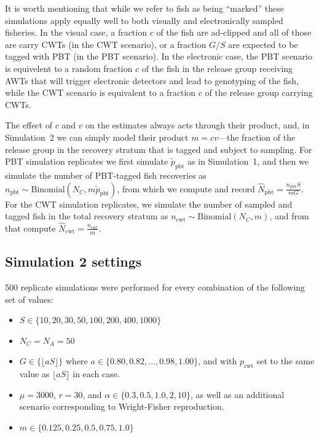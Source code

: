 \documentclass[11pt]{article}
\begin{document}
It is worth mentioning that while we refer to fish as being ``marked'' these simulations apply equally well to both visually
and electronically sampled fisheries.  In the visual case, a fraction $c$ of the fish are ad-clipped and all of those are
carry CWTs (in the CWT scenario), or a fraction $G/S$ are expected to be tagged with PBT (in the PBT scenario).  
In the electronic case, the PBT scenario is 
equivelent to a random fraction $c$ of the fish in the release group receiving AWTs that will trigger electronic detectors
and lead to genotyping of the fish, while the CWT scenario is equivalent to a fraction $c$ of the release group
carrying CWTs.   


The effect of $c$ and $v$ on the estimates always acts through their product, and, in Simulation~2 we can
simply model their product $m = cv$---the fraction of the release group in the recovery stratum that is tagged and subject to sampling.
For PBT simulation replicates we first simulate $\tilde{p}_\mathrm{pbt}$ as in Simulation~1, and then we
simulate the number of PBT-tagged fish recoveries as $n_\mathrm{pbt}\sim\mathrm{Binomial}(N_C, m \tilde{p}_\mathrm{pbt})$, from which 
we compute and record $\hat{N}_\mathrm{pbt} = \frac{n_\mathrm{pbt}S}{mG}$.  For the CWT simulation replicates, we simulate the number of sampled
and tagged fish in the total recovery stratum as $n_\mathrm{cwt} \sim \mathrm{Binomial}(N_C, m)$, and from that compute
$\hat{N}_\mathrm{cwt} = \frac{n_\mathrm{cwt}}{m}$.
 
 
\subsection{Simulation 2 settings} 

500 replicate simulations were performed for every combination of the following set of values:
\begin{itemize}
\item $S \in \{10, 20, 30, 50, 100, 200, 400, 1000\}$
\item $N_C = N_A = 50$
\item $G \in \{\lfloor a S\rfloor\}$ where $a \in \{0.80, 0.82, \ldots, 0.98, 1.00\}$, and with $p_\mathrm{cwt}$ set to the same
value as $\lfloor a S\rfloor$ in each case.
\item $\mu = 3000$, $r = 30$, and $\alpha \in \{0.3, 0.5, 1.0, 2, 10\}$, as well as an additional scenario corresponding to
Wright-Fisher reproduction. 
\item $m \in \{0.125, 0.25, 0.5, 0.75, 1.0\}$
\end{itemize}
\end{document}
